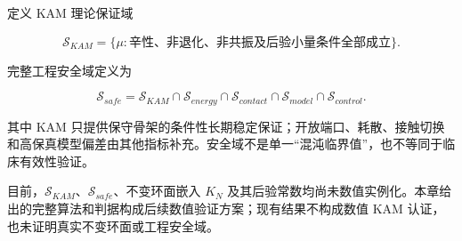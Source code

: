 定义 KAM 理论保证域

\begin{equation}
\label{eq:symplectic-kam-5-20}
\mathcal{S}_{KAM} = \{\mu:\text{辛性、非退化、非共振及后验小量条件全部成立}\}.
\end{equation}

完整工程安全域定义为

\begin{equation}
\label{eq:symplectic-kam-5-21}
\boxed{\mathcal{S}_{safe} = \mathcal{S}_{KAM} \cap \mathcal{S}_{energy} \cap \mathcal{S}_{contact} \cap \mathcal{S}_{model} \cap \mathcal{S}_{control}.}
\end{equation}

其中 KAM 只提供保守骨架的条件性长期稳定保证；开放端口、耗散、接触切换和高保真模型偏差由其他指标补充。安全域不是单一``混沌临界值''，也不等同于临床有效性验证。

目前，\(\mathcal{S}_{KAM}\)、\(\mathcal{S}_{safe}\)、不变环面嵌入 \(K_N\) 及其后验常数均尚未数值实例化。本章给出的完整算法和判据构成后续数值验证方案；现有结果不构成数值 KAM 认证，也未证明真实不变环面或工程安全域。
